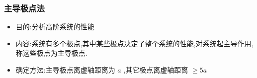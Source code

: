 \documentclass{beamer}
\begin{document}
\begin{frame}
\frametitle{主导极点法}
\label{sec-4-4}

\begin{itemize}
\item <2->目的:分析高阶系统的性能
\item <3->内容:系统有多个极点,其中某些极点决定了整个系统的性能,对系统起主导作用,称这些极点为主导极点.
\item <4->确定方法:主导极点离虚轴距离为 $a$ ,其它极点离虚轴距离 $\geq 5a$
\end{itemize}
\end{frame}
\end{document}
